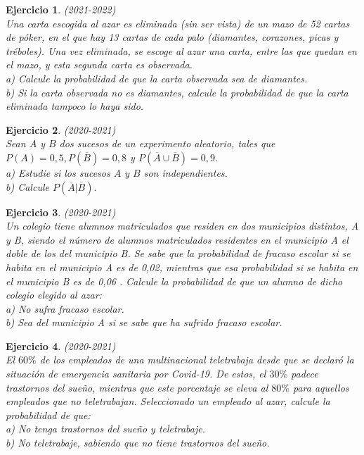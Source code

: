 \documentclass[12pt, a4paper]{amsart}
\newtheorem{ejer}{Ejercicio}
\begin{document}
\begin{ejer}\em (2021-2022)\\
Una carta escogida al azar es eliminada (sin ser vista) de un mazo de 52 cartas de póker, en el que hay 13 cartas de cada palo (diamantes, corazones, picas y tréboles). Una vez eliminada, se escoge al azar una carta, entre las que quedan en el mazo, y esta segunda carta es observada.\\
a) Calcule la probabilidad de que la carta observada sea de diamantes.\\
b) Si la carta observada no es diamantes, calcule la probabilidad de que la carta eliminada tampoco lo haya sido.
\end{ejer}

\begin{ejer}\em (2020-2021)\\
Sean $A$ y $B$ dos sucesos de un experimento aleatorio, tales que $P (A) = 0, 5 , P (\overline{B}) = 0, 8$ y $P (\overline{A} \cup \overline{B}) = 0, 9.$\\
a) Estudie si los sucesos $A$ y $B$ son independientes.\\
b) Calcule $P (\overline{A}|\overline{B}) .$
\end{ejer}

\begin{ejer}\em (2020-2021)\\
Un colegio tiene alumnos matriculados que residen en dos municipios distintos, A y B, siendo el número de alumnos matriculados residentes en el municipio A el doble de los del municipio B. Se sabe que la probabilidad de fracaso escolar si se habita en el municipio A es de 0,02, mientras que esa probabilidad si se habita en el municipio B es de 0,06 . Calcule la probabilidad de que un alumno de dicho colegio elegido al azar:\\
a) No sufra fracaso escolar.\\
b) Sea del municipio A si se sabe que ha sufrido fracaso escolar.
\end{ejer}

\begin{ejer}\em (2020-2021)\\
El $60\%$ de los empleados de una multinacional teletrabaja desde que se declaró la situación de emergencia
sanitaria por Covid-19. De estos, el $30\%$ padece trastornos del sueño, mientras que este porcentaje se eleva al
$80\%$ para aquellos empleados que no teletrabajan. Seleccionado un empleado al azar, calcule la probabilidad
de que:\\
a) No tenga trastornos del sueño y teletrabaje.\\
b) No teletrabaje, sabiendo que no tiene trastornos del sueño.
\end{ejer}
\end{document}
